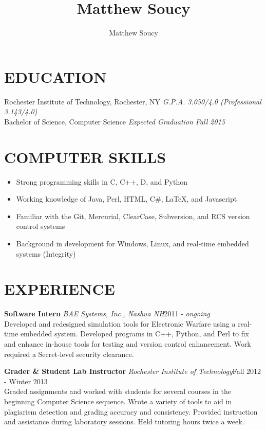 \documentclass[line]{res}
\author{Matthew Soucy}
\title{Matthew Soucy}
\newcommand{\job}[3]{{\bf #1} {\it #2}\hfill #3\\}
\begin{document}
\setlength{\textheight}{11.5in} %
\address{\large
	2433 Nathaniel Rochester Hall \\
	Rochester, NY 14623 \\
	(585) 204-7402
}
\address{\it
	msoucy@csh.rit.edu \\
	http://msoucy.me/ \\
	http://linkedin.com/in/msoucy
}

\begin{resume}

\section{EDUCATION}

	Rochester Institute of Technology, Rochester, NY
	\hfill
	\textit{G.P.A. 3.050/4.0 (Professional 3.143/4.0)} \\
	Bachelor of Science, Computer Science
	\hfill
	\textit{Expected Graduation Fall 2015}

\section{COMPUTER SKILLS}

	\begin{itemize}[leftmargin=10pt]
	\item Strong programming skills in C, C++, D, and Python
	\item Working knowledge of Java, Perl, HTML, C\#, LaTeX, and Javascript
	\item Familiar with the Git, Mercurial, ClearCase, Subversion, and RCS version control systems
	\item Background in development for Windows, Linux, and real-time embedded systems (Integrity)
	\end{itemize}

\section{EXPERIENCE}

	\job{Software Intern}{BAE Systems, Inc., Nashua NH}{2011 - \textit{ongoing}}
	Developed and redesigned simulation tools for Electronic Warfare using a real-time embedded system.
	Developed programs in C++, Python, and Perl to fix and enhance in-house tools for testing and version control enhancement.
	Work required a Secret-level security clearance.

	\job{Grader \& Student Lab Instructor}{Rochester Institute of Technology}{Fall 2012 - Winter 2013}
	Graded assignments and worked with students for several courses in the beginning Computer Science sequence.
	Wrote a variety of tools to aid in plagiarism detection and grading accuracy and consistency.
	Provided instruction and assistance during laboratory sessions.
	Held tutoring hours twice a week.


\end{resume}
\end{document}
